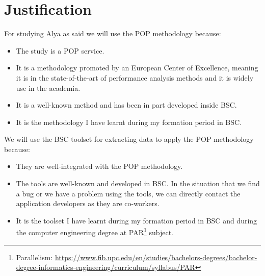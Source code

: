 \section{Justification}
\label{sec:justification}
\justify
For studying Alya as said we will use the POP methodology because:

\begin{itemize}
  \item The study is a POP service.
  \item It is a methodology promoted by an European Center of Excellence, meaning it is in the state-of-the-art of performance analysis methods and it is widely use in the academia.
  \item It is a well-known method and has been in part developed inside BSC.
  \item It is the methodology I have learnt during my formation period in BSC.
\end{itemize}

\justify
We will use the BSC toolset for extracting data to apply the POP methodology because:

\begin{itemize}
  \item They are well-integrated with the POP methodology.
  \item The tools are well-known and developed in BSC. In the situation that we find a bug or we have a problem using the tools, we can directly contact the application developers as they are co-workers.
  \item It is the toolset I have learnt during my formation period in BSC and during the computer engineering degree at PAR\footnote{Parallelism: \url{https://www.fib.upc.edu/en/studies/bachelors-degrees/bachelor-degree-informatics-engineering/curriculum/syllabus/PAR}} subject.
\end{itemize}

